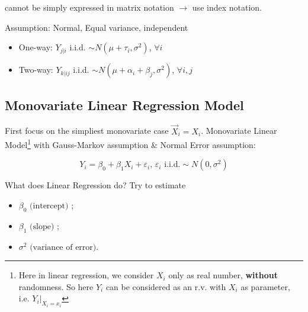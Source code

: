     cannot be simply expressed in matrix notation $ \longrightarrow $ use index notation.

    Assumption: Normal, Equal variance, independent
\begin{itemize}[topsep=2pt,itemsep=0pt]
    \item One-way: $ Y_{j|i} $ i.i.d. $ \sim N(\mu+\tau_i,\sigma ^2) $, $ \forall i $
    \item Two-way: $ Y_{k|ij} $ i.i.d. $ \sim N(\mu +\alpha _i+\beta _j,\sigma ^2) $, $ \forall i,j $
\end{itemize}

    
    
    
    

    






























\subsection{Monovariate Linear Regression Model}
    First focus on the simpliest monovariate case $ \vec{X}_i=X_i $. Monovariate Linear Model\footnote{Here in linear regression, we consider $ X_i $ only as real number, \textbf{without} randomness. So here $ Y_i $ can be considered as an r.v. with $ X_i $ as parameter, i.e. $ Y_i|_{X_i=x_i} $}
    with Gauss-Markov assumption \& Normal Error assumption:
    
    \begin{equation}
        Y_i=\beta _0+\beta _1X_i+\varepsilon _i ,\, \varepsilon _i\text{ i.i.d.}\sim N(0,\sigma ^2) 
    \end{equation}


 
  


    What does Linear Regression do? Try to estimate 
    \begin{itemize}[topsep=0pt,itemsep=-2pt]
        \item $ \beta _0\text{ (intercept) }$;
        \item $\beta _1\text{ (slope) }$;
        \item $\sigma ^2\text{ (variance of error)} $.
    \end{itemize}
    
